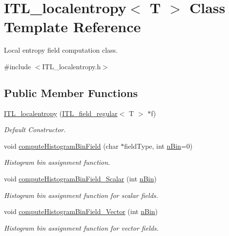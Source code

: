\hypertarget{classITL__localentropy}{
\section{ITL\_\-localentropy$<$ T $>$ Class Template Reference}
\label{classITL__localentropy}
}


Local entropy field computation class.  




{\ttfamily \#include $<$ITL\_\-localentropy.h$>$}

\subsection*{Public Member Functions}
\begin{DoxyCompactItemize}
\item 
\hyperlink{classITL__localentropy_adbb3a1033c4db7b0bafffb0935a05d1c}{ITL\_\-localentropy} (\hyperlink{classITL__field__regular}{ITL\_\-field\_\-regular}$<$ T $>$ $\ast$f)
\begin{DoxyCompactList}\small\item\em Default Constructor. \item\end{DoxyCompactList}\item 
void \hyperlink{classITL__localentropy_af9f9dd7793d4435af57bd6a56a91e2db}{computeHistogramBinField} (char $\ast$fieldType, int \hyperlink{MainIT__regvector_8cpp_a7f13753d4707f6bc8f71d8bdacedefb3}{nBin}=0)
\begin{DoxyCompactList}\small\item\em Histogram bin assignment function. \item\end{DoxyCompactList}\item 
void \hyperlink{classITL__localentropy_a6bc03e6046e17fd950d35c30082bb2b3}{computeHistogramBinField\_\-Scalar} (int \hyperlink{MainIT__regvector_8cpp_a7f13753d4707f6bc8f71d8bdacedefb3}{nBin})
\begin{DoxyCompactList}\small\item\em Histogram bin assignment function for scalar fields. \item\end{DoxyCompactList}\item 
void \hyperlink{classITL__localentropy_aca2e2602a26960d75be5edb64df37db2}{computeHistogramBinField\_\-Vector} (int \hyperlink{MainIT__regvector_8cpp_a7f13753d4707f6bc8f71d8bdacedefb3}{nBin})
\begin{DoxyCompactList}\small\item\em Histogram bin assignment function for vector fields. \item\end{DoxyCompactList}\item 

\end{DoxyCompactItemize}
